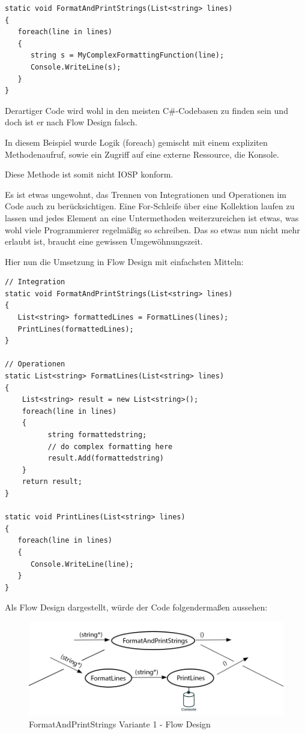 \begin{lstlisting}[caption=FormatAndPrintStrings nicht IOSP-konfrom]
static void FormatAndPrintStrings(List<string> lines)
{
   foreach(line in lines)
   {
      string s = MyComplexFormattingFunction(line);
      Console.WriteLine(s);
   }
}
\end{lstlisting}
Derartiger Code wird wohl in den meisten C\#-Codebasen zu finden sein und doch ist er nach Flow Design falsch.

In diesem Beispiel wurde Logik (foreach) gemischt mit einem expliziten
Methodenaufruf, sowie ein Zugriff auf eine externe Ressource, die
Konsole.

Diese Methode ist somit nicht IOSP konform.

Es ist etwas ungewohnt, das Trennen von Integrationen und Operationen im Code auch zu berücksichtigen.
Eine For-Schleife über eine Kollektion laufen zu lassen und jedes Element an eine Untermethoden weiterzureichen ist etwas,
was wohl viele Programmierer regelmäßig so schreiben.
Das so etwas nun nicht mehr erlaubt ist, braucht eine gewissen Umgewöhnungszeit.

\bigskip

Hier nun die Umsetzung in Flow Design mit einfachsten Mitteln:

\begin{lstlisting}[caption=FormatAndPrintStrings Variante 1]
// Integration
static void FormatAndPrintStrings(List<string> lines)
{
   List<string> formattedLines = FormatLines(lines);
   PrintLines(formattedLines);
}

// Operationen
static List<string> FormatLines(List<string> lines)
{
    List<string> result = new List<string>();
    foreach(line in lines)
    {
          string formattedstring;
          // do complex formatting here
          result.Add(formattedstring)
    }
    return result;
}

static void PrintLines(List<string> lines)
{
   foreach(line in lines)
   {
      Console.WriteLine(line);
   }
}
\end{lstlisting}


Als Flow Design dargestellt, würde der Code folgendermaßen aussehen:
\begin{figure}[H]
	\centering
	\includegraphics[width=1\linewidth]{./img/flowForeach1.png}
	\caption{FormatAndPrintStrings Variante 1 - Flow Design}
\end{figure}


